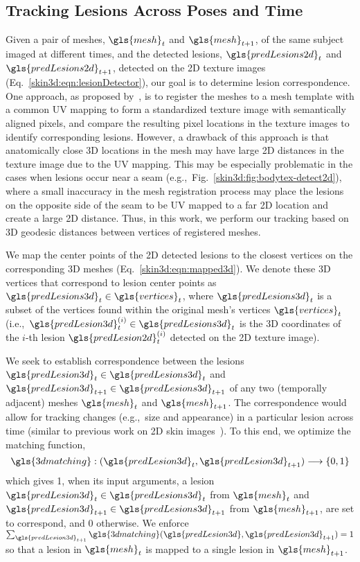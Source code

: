 \documentclass[journal]{IEEEtran}
\def\ie{i.e.,~}
\def\eg{e.g.,~}
\begin{document}
\subsection{Tracking Lesions Across Poses and Time}
\label{skin3d:sec:tracking}
Given a pair of meshes, $\gls{mesh}_t$ and $\gls{mesh}_{t+1}$, of the same subject imaged at different times, and the detected lesions, $\gls{predLesions2d}_{t}$ and $\gls{predLesions2d}_{t+1}$, detected on the 2D texture images (Eq.~\ref{skin3d:eqn:lesionDetector}), our goal is to determine lesion correspondence. One approach, as proposed by~\citet{Bogo2014a}, is to register the meshes to a mesh template with a common UV mapping to form a standardized texture image with semantically aligned pixels, and compare the resulting pixel locations in the texture images to identify corresponding lesions. However, a drawback of this approach is that anatomically close 3D locations in the mesh may have large 2D distances in the texture image due to the UV mapping. This may be especially problematic in the cases when lesions occur near a seam (\eg Fig.~\ref{skin3d:fig:bodytex-detect2d}), where a small inaccuracy in the mesh registration process may place the lesions on the opposite side of the seam to be UV mapped to a far 2D location and create a large 2D distance. Thus, in this work, we perform our tracking based on 3D geodesic distances between vertices of registered meshes.

We map the center points of the 2D detected lesions to the closest vertices on the corresponding 3D meshes (Eq.~\ref{skin3d:eqn:mapped3d}). We denote these 3D vertices that correspond to lesion center points as $\gls{predLesions3d}_t \in \gls{vertices}_t$, where $\gls{predLesions3d}_t$ is a subset of the vertices found within the original mesh's vertices $\gls{vertices}_t$ (\ie $\gls{predLesion3d}^{(i)}_t \in \gls{predLesions3d}_t$ is the 3D coordinates of the $i$-th lesion $\gls{predLesion2d}_t^{(i)}$ detected on the 2D texture image). 

We seek to establish correspondence between the lesions $\gls{predLesion3d}_t\in \gls{predLesions3d}_t$ and $\gls{predLesion3d}_{t+1}\in \gls{predLesions3d}_{t+1}$ of any two (temporally adjacent) meshes $\gls{mesh}_t$ and $\gls{mesh}_{t+1}$. The correspondence would allow for tracking changes (\eg size and appearance) in a particular lesion across time (similar to previous work on 2D skin images~\citep{Mirzaalian2016}). To this end, we optimize the matching function,
\begin{equation}
{\gls{3dmatching}} :(\gls{predLesion3d}_t, \gls{predLesion3d}_{t+1}) \longrightarrow \{0, 1\}
\end{equation}
which gives 1, when its input arguments, a lesion $\gls{predLesion3d}_t \in \gls{predLesions3d}_{t}$ from $\gls{mesh}_t$ and $\gls{predLesion3d}_{t+1} \in \gls{predLesions3d}_{t+1}$ from $\gls{mesh}_{t+1}$, are set to  correspond, and 0 otherwise. We enforce $\sum_{\gls{predLesion3d}_{t+1}}{\gls{3dmatching}}(\gls{predLesion3d},\gls{predLesion3d}_{t+1}) = 1$ so that a lesion in $\gls{mesh}_t$ is mapped to a single lesion in $\gls{mesh}_{t+1}$. 
\end{document}
